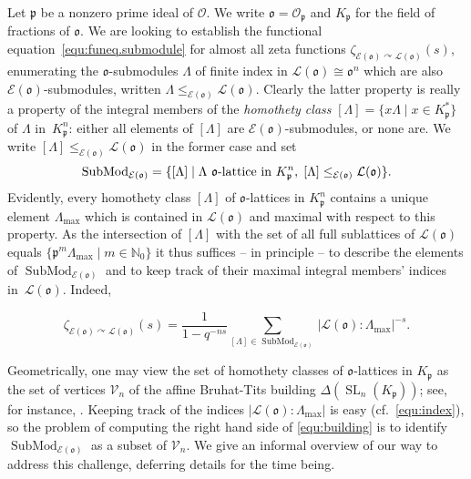 \documentclass[11pt]{amsart}
\numberwithin{equation}{section}
\numberwithin{figure}{section}
\theoremstyle{plain}
\theoremstyle{definition}
\theoremstyle{remark}
\begin{document}
Let ${\mathfrak{p}} $ be a nonzero prime ideal of ${\ensuremath{\mathcal{O}}}$. We write ${\mathfrak o} =
{\ensuremath{\mathcal{O}}}_{\mathfrak{p}}$ and $K_{\mathfrak{p}}$ for the field of fractions of ${\mathfrak o}$.  We are
looking to establish the functional
equation~\eqref{equ:funeq.submodule} for almost all zeta functions
$\zeta_{{\mathcal{E}}({\mathfrak o}){\curvearrowright} {\ensuremath{\mathcal{L}}}({\mathfrak o})}(s)$, enumerating the
${\mathfrak o}$-submodules $\Lambda$ of finite index in ${\ensuremath{\mathcal{L}}}({\mathfrak o}) \cong
{\mathfrak o}^n$ which are also ${\mathcal{E}}({\mathfrak o})$-submodules, written $\Lambda
\leq_{{\mathcal{E}}({\mathfrak o})}{\ensuremath{\mathcal{L}}}({\mathfrak o})$. Clearly the latter property is really a
property of the integral members of the \emph{homothety class}
$[\Lambda] = \{x \Lambda\mid x\in K_{\mathfrak{p}}^*\}$ of $\Lambda$
in~$K_{\mathfrak{p}}^n$: either all elements of $[\Lambda]$ are
${\mathcal{E}}({\mathfrak o})$-submodules, or none are. We write
$[\Lambda]\leq_{{\mathcal{E}}({\mathfrak o})}{\ensuremath{\mathcal{L}}}({\mathfrak o})$ in the former case and set
$$\operatorname{SubMod}_{{\mathcal{E}}({\mathfrak o})} = \{[\Lambda] \mid \Lambda \textup{
  ${\mathfrak o}$-lattice in $K_{\mathfrak{p}}^n$},
\;[\Lambda]\leq_{{\mathcal{E}}({\mathfrak o})}{\ensuremath{\mathcal{L}}}({\mathfrak o})\}.$$ Evidently, every homothety
class $[\Lambda]$ of ${\mathfrak o}$-lattices in $K_{\mathfrak{p}}^n$ contains a unique
element $\Lambda_{\max}$ which is contained in ${\ensuremath{\mathcal{L}}}({\mathfrak o})$ and
maximal with respect to this property. As the intersection of
$[\Lambda]$ with the set of all full sublattices of ${\ensuremath{\mathcal{L}}}({\mathfrak o})$
equals $\{ {\mathfrak{p}}^m \Lambda_{\max} \mid m\in{\ensuremath{\mathbb{N}}}_0\}$ it thus suffices --
in principle -- to describe the elements of $\operatorname{SubMod}_{{\mathcal{E}}({\mathfrak o})}$ and
to keep track of their maximal integral members' indices
in~${\ensuremath{\mathcal{L}}}({\mathfrak o})$. Indeed,

\begin{equation}\label{equ:building}
  \zeta_{{\mathcal{E}}({\mathfrak o}){\curvearrowright} {\ensuremath{\mathcal{L}}}({\mathfrak o})}(s) = \frac{1}{1-q^{-ns}}
  \sum_{[\Lambda] \in \operatorname{SubMod}_{{\mathcal{E}}({\mathfrak o})}}
  |{\ensuremath{\mathcal{L}}}({\mathfrak o}):\Lambda_{\max}|^{-s}.
\end{equation}

Geometrically, one may view the set of homothety classes of
${\mathfrak o}$-lattices in $K_{\mathfrak{p}}$ as the set of vertices ${\ensuremath{\mathcal{V}}}_n$ of the
affine Bruhat-Tits building $\Delta(\operatorname{SL}_n(K_{\mathfrak{p}}))$; see, for
instance, \cite[Chapter~19]{Garrett/97}. Keeping track of the indices
$|{\ensuremath{\mathcal{L}}}({\mathfrak o}):\Lambda_{\max}|$ is easy (cf.~\eqref{equ:index}), so the
problem of computing the right hand side of \eqref{equ:building} is to
identify $\operatorname{SubMod}_{{\mathcal{E}}({\mathfrak o})}$ as a subset of ${\ensuremath{\mathcal{V}}}_n$.  We give an
informal overview of our way to address this challenge, deferring
details for the time being.
\end{document}
